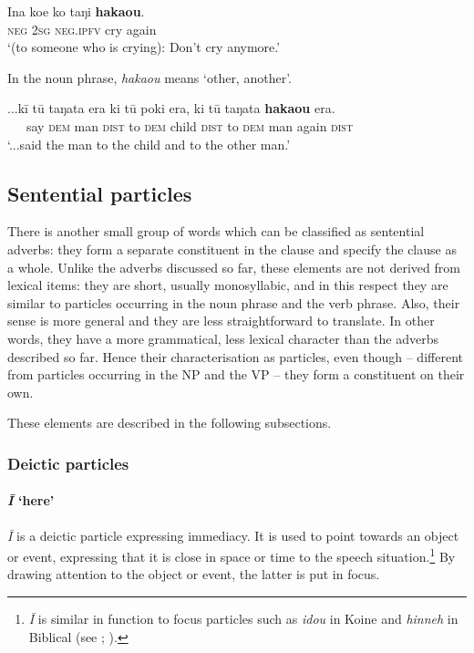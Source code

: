 \ea\label{ex:4.143}
\gll {\ꞌ}Ina koe ko taŋi \textbf{haka{\ꞌ}ou}.\\
\textsc{neg} \textsc{2sg} \textsc{neg.ipfv} cry again\\

\glt
‘(to someone who is crying): Don’t cry anymore.’ \textstyleExampleref{[R349.016]} 
\z

In the noun phrase, \textit{haka{\ꞌ}ou} means ‘other, another’.

\ea\label{ex:4.144}
\gll ...kī tū taŋata era ki tū poki era, ki tū taŋata \textbf{haka{\ꞌ}ou} era. \\
~~~say \textsc{dem} man \textsc{dist} to \textsc{dem} child \textsc{dist} to \textsc{dem} man again \textsc{dist} \\

\glt 
‘...said the man to the child and to the other man.’ \textstyleExampleref{[R102.020]} 
\z
{}
\subsection{Sentential particles}\label{sec:4.5.4}

There is another small group of words which can be classified as sentential adverbs: they form a separate constituent in the clause and specify the clause as a whole. Unlike the adverbs discussed so far, these elements are not derived from lexical items: they are short, usually monosyllabic, and in this respect they are similar to particles occurring in the noun phrase and the verb phrase. Also, their sense is more general and they are less straightforward to translate. In other words, they have a more grammatical, less lexical character than the adverbs described so far. Hence their characterisation as particles, even though – different from particles occurring in the NP and the VP – they form a constituent on their own.

These elements are described in the following subsections.

\subsubsection{Deictic particles}\label{sec:4.5.4.1}
\paragraph[{\ꞌ}ī ‘here’]{\textit{{\ꞌ}Ī} ‘here’}\label{sec:4.5.4.1.1}
\textit{{\ꞌ}Ī} is a deictic particle expressing immediacy. It is used to point towards an object or event, expressing that it is close in space or time to the speech situation.\footnote{\label{fn:200}\textit{{\ꞌ}Ī} is similar in function to focus particles such as \textit{idou} in Koine  and \textit{hinneh} in Biblical  (see \citealt[58, 82]{Levinsohn2007}; \citealt{Bailey2009}).} By drawing attention to the object or event, the latter is put in focus.

